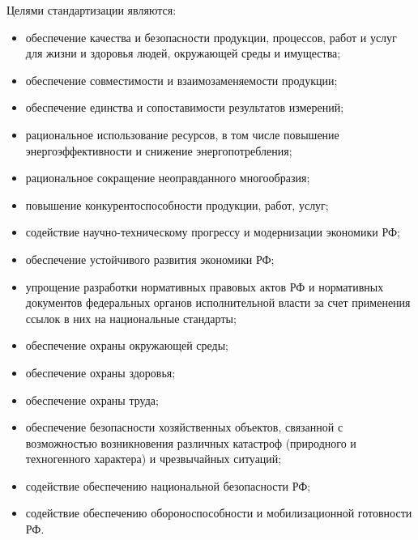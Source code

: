 Целями стандартизации являются:
\begin{itemize}
\item обеспечение качества и безопасности продукции, процессов, работ и услуг для жизни и здоровья людей, окружающей среды и имущества;
\item обеспечение совместимости и взаимозаменяемости продукции;
\item обеспечение единства и сопоставимости результатов измерений;
\item рациональное использование ресурсов, в том числе повышение энергоэффективности и снижение энергопотребления;
\item рациональное сокращение неоправданного многообразия;
\item повышение конкурентоспособности продукции, работ, услуг;
\item содействие научно-техническому прогрессу и модернизации экономики РФ;
\item обеспечение устойчивого развития экономики РФ;
\item упрощение разработки нормативных правовых актов РФ и нормативных документов федеральных органов исполнительной власти за счет применения ссылок в них на национальные стандарты;
\item обеспечение охраны окружающей среды;
\item обеспечение охраны здоровья;
\item обеспечение охраны труда;
\item обеспечение безопасности хозяйственных объектов, связанной с возможностью возникновения различных катастроф (природного и техногенного характера) и чрезвычайных ситуаций;
\item содействие обеспечению национальной безопасности РФ;
\item содействие обеспечению обороноспособности и мобилизационной готовности РФ.
\end{itemize}

